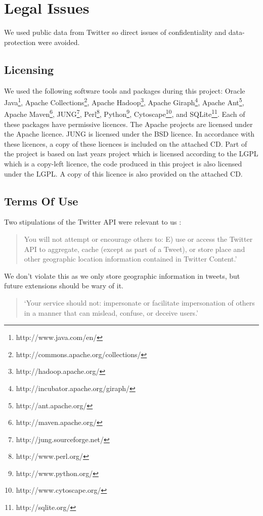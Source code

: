 \section{Legal Issues}

We used public data from Twitter so direct issues of confidentiality and data-protection were avoided.

\subsection{Licensing}

We used the following software tools and packages during this project: Oracle Java\footnote{http://www.java.com/en/}, Apache Collections\footnote{http://commons.apache.org/collections/}, Apache Hadoop\footnote{http://hadoop.apache.org/}, Apache Giraph\footnote{http://incubator.apache.org/giraph/}, Apache Ant\footnote{http://ant.apache.org/}, Apache Maven\footnote{http://maven.apache.org/}, JUNG\footnote{http://jung.sourceforge.net/}, Perl\footnote{http://www.perl.org/}, Python\footnote{http://www.python.org/}, Cytoscape\footnote{http://www.cytoscape.org/}, and SQLite\footnote{http://sqlite.org/}. Each of these packages have permissive licences. The Apache projects are licensed under the Apache licence. JUNG is licensed under the BSD licence. In accordance with these licences, a copy of these licences is included on the attached CD. Part of the project is based on last years project which is licensed according to the LGPL which is a copy-left licence, the code produced in this project is also licensed under the LGPL. A copy of this licence is also provided on the attached CD.

\subsection{Terms Of Use}

Two stipulations of the Twitter API were relevant to us \cite{twitterTOS}:

\begin{quotation}You will not attempt or encourage others to: E) use or access the Twitter API to aggregate, 
cache (except as part of a Tweet), or store place and other geographic location information 
contained in Twitter Content.'
\end{quotation}

We don't violate this as we only store geographic information in tweets, but future extensions should be wary of it.

\begin{quotation}
`Your service should not: impersonate or facilitate impersonation of others in a manner that can mislead, confuse, or deceive users.'
\end{quotation}

